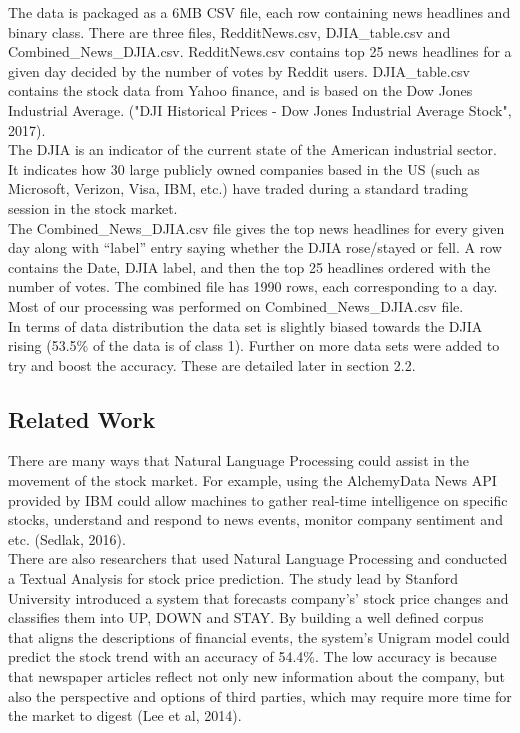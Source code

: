 \documentclass[11pt,a4paper]{article}
\begin{document}
The data is packaged as a 6MB CSV file, each row containing news headlines and binary class. There are three files, RedditNews.csv, DJIA\_table.csv and Combined\_News\_DJIA.csv. RedditNews.csv contains top 25 news headlines for a given day decided by the number of votes by Reddit users. DJIA\_table.csv contains the stock data from Yahoo finance, and is based on the Dow Jones Industrial Average. ("DJI Historical Prices - Dow Jones Industrial Average Stock", 2017). \\

The DJIA is an indicator of the current state of the American industrial sector. It indicates how 30 large publicly owned companies based in the US (such as Microsoft, Verizon, Visa, IBM, etc.) have traded during a standard trading session in the stock market.\\

The Combined\_News\_DJIA.csv file gives the top news headlines for every given day along with “label” entry saying whether the DJIA rose/stayed or fell. A row contains the Date, DJIA label, and then the top 25 headlines ordered with the number of votes. The combined file has 1990 rows, each corresponding to a day. Most of our processing was performed on Combined\_News\_DJIA.csv file.\\

In terms of data distribution the data set is slightly biased towards the DJIA rising (53.5\% of the data is of class 1). Further on more data sets were added to try and boost the accuracy. These are detailed later in section 2.2.


\subsection{Related Work}
There are many ways that Natural Language Processing could assist in the movement of the  stock market. For example, using the AlchemyData News API provided by IBM could allow machines to gather real-time intelligence on specific stocks, understand and respond to news events, monitor company sentiment and etc. (Sedlak, 2016).\\

There are also researchers that used Natural Language Processing and conducted a Textual Analysis for stock price prediction. The study lead by Stanford University introduced a system that forecasts company's’ stock price changes and classifies them into UP, DOWN and STAY. By building a well defined corpus that aligns the descriptions of financial events, the system's Unigram model could predict the stock trend with an accuracy of 54.4\%. The low accuracy is because that newspaper articles reflect not only new information about the company, but also the perspective and options of third parties, which may require more time for the market to digest (Lee et al, 2014).\\
\end{document}
